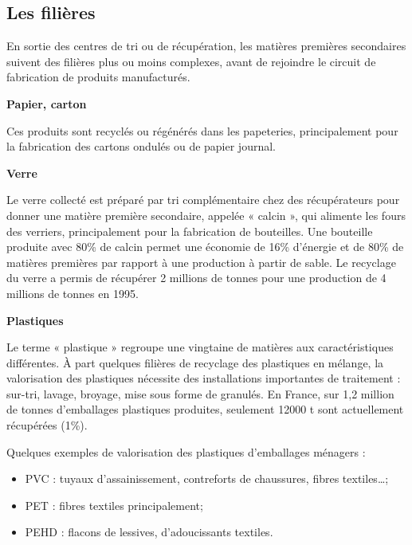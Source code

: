 \subsection{Les filières}

En sortie des centres de tri ou de récupération, les matières premières secondaires suivent des filières plus ou moins complexes, avant de rejoindre le circuit de fabrication de produits manufacturés.
\vspace{0.3 cm}

\textbf{Papier, carton }
\vspace{0.3 cm}

Ces produits sont recyclés ou régénérés dans les papeteries, principalement pour la fabrication des cartons ondulés ou de papier journal. 
\vspace{0.3 cm}

\textbf{Verre}
\vspace{0.3 cm}

Le verre collecté est préparé par tri complémentaire chez des récupérateurs pour donner une matière première secondaire, appelée « calcin », qui alimente les fours des verriers, principalement pour la fabrication de bouteilles. Une bouteille produite avec 80\% de calcin permet une économie de 16\% d’énergie et de 80\% de matières premières par rapport à une production à partir de sable. Le recyclage du verre a permis de récupérer 2 millions de tonnes pour une production de 4 millions de tonnes en 1995.
\vspace{0.3 cm}

\textbf{Plastiques }
\vspace{0.3 cm}

Le terme « plastique » regroupe une vingtaine de matières aux caractéristiques différentes. À part quelques filières de recyclage des plastiques en mélange, la valorisation des plastiques nécessite des installations importantes de traitement : sur-tri, lavage, broyage, mise sous forme de granulés. En France, sur 1,2 million de tonnes d’emballages plastiques produites, seulement 12000 t sont actuellement récupérées (1\%).

Quelques exemples de valorisation des plastiques d’emballages ménagers :
\begin{itemize}
\item PVC : tuyaux d’assainissement, contreforts de chaussures, fibres textiles…;
\item PET : fibres textiles principalement;
\item  PEHD : flacons de lessives, d’adoucissants textiles.
    
\end{itemize}
\vspace{0.3 cm}

